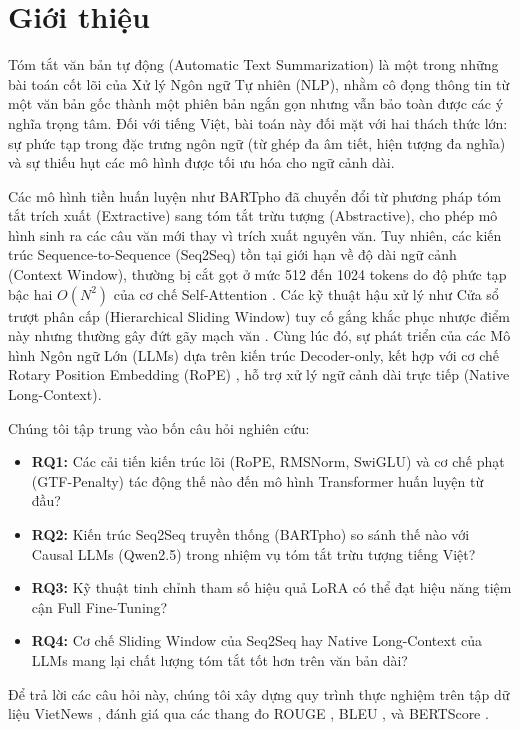 \documentclass{article}
\begin{document}
\section{Giới thiệu}
\label{sec:intro}

Tóm tắt văn bản tự động (Automatic Text Summarization) là một trong những bài toán cốt lõi của Xử lý Ngôn ngữ Tự nhiên (NLP), nhằm cô đọng thông tin từ một văn bản gốc thành một phiên bản ngắn gọn nhưng vẫn bảo toàn được các ý nghĩa trọng tâm. Đối với tiếng Việt, bài toán này đối mặt với hai thách thức lớn: sự phức tạp trong đặc trưng ngôn ngữ (từ ghép đa âm tiết, hiện tượng đa nghĩa) và sự thiếu hụt các mô hình được tối ưu hóa cho ngữ cảnh dài.

Các mô hình tiền huấn luyện như BARTpho \cite{bartpho} đã chuyển đổi từ phương pháp tóm tắt trích xuất (Extractive) sang tóm tắt trừu tượng (Abstractive), cho phép mô hình sinh ra các câu văn mới thay vì trích xuất nguyên văn. Tuy nhiên, các kiến trúc Sequence-to-Sequence (Seq2Seq) tồn tại giới hạn về độ dài ngữ cảnh (Context Window), thường bị cắt gọt ở mức 512 đến 1024 tokens do độ phức tạp bậc hai $O(N^2)$ của cơ chế Self-Attention \cite{vaswani2017}. Các kỹ thuật hậu xử lý như Cửa sổ trượt phân cấp (Hierarchical Sliding Window) tuy cố gắng khắc phục nhược điểm này nhưng thường gây đứt gãy mạch văn \cite{map_reduce_summarization}. Cùng lúc đó, sự phát triển của các Mô hình Ngôn ngữ Lớn (LLMs) dựa trên kiến trúc Decoder-only, kết hợp với cơ chế Rotary Position Embedding (RoPE) \cite{rope}, hỗ trợ xử lý ngữ cảnh dài trực tiếp (Native Long-Context).

Chúng tôi tập trung vào bốn câu hỏi nghiên cứu:
\begin{itemize}
    \item \textbf{RQ1:} Các cải tiến kiến trúc lõi (RoPE, RMSNorm, SwiGLU) và cơ chế phạt (GTF-Penalty) tác động thế nào đến mô hình Transformer huấn luyện từ đầu?
    \item \textbf{RQ2:} Kiến trúc Seq2Seq truyền thống (BARTpho) so sánh thế nào với Causal LLMs (Qwen2.5) trong nhiệm vụ tóm tắt trừu tượng tiếng Việt?
    \item \textbf{RQ3:} Kỹ thuật tinh chỉnh tham số hiệu quả LoRA \cite{lora} có thể đạt hiệu năng tiệm cận Full Fine-Tuning?
    \item \textbf{RQ4:} Cơ chế Sliding Window của Seq2Seq hay Native Long-Context của LLMs mang lại chất lượng tóm tắt tốt hơn trên văn bản dài?
\end{itemize}
Để trả lời các câu hỏi này, chúng tôi xây dựng quy trình thực nghiệm trên tập dữ liệu VietNews \cite{vietnews}, đánh giá qua các thang đo ROUGE \cite{rouge_original}, BLEU \cite{bleu_original}, và BERTScore \cite{bertscore}.
\end{document}
